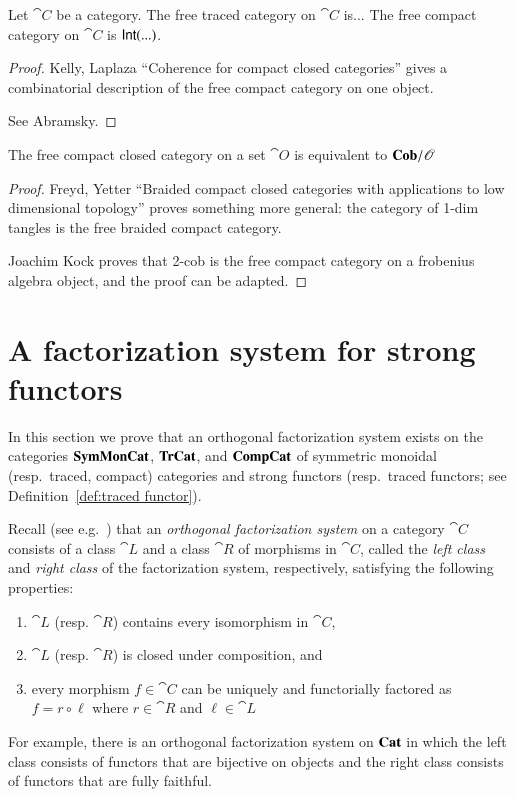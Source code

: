 \documentclass[12pt,oneside,article,draft]{memoir}
\begin{document}
\begin{proposition}\label{prop:free traced and compact}
	Let $\cat{C}$ be a category.
	The free traced category on $\cat{C}$ is...
	The free compact category on $\cat{C}$ is $\mathsf{Int}(...)$.
\end{proposition}
\begin{proof}
	Kelly, Laplaza ``Coherence for compact closed categories'' gives a combinatorial description of the free compact category on one object. 

	See Abramsky. 
\end{proof}

\begin{proposition}\label{prop:free compact is Cob}
	The free compact closed category on a set $\cat{O}$ is equivalent to $\mathbf{Cob}/\mathscr{O}$
\end{proposition}
\begin{proof}
	Freyd, Yetter ``Braided compact closed categories with applications to low dimensional topology'' proves something more general: the category of 1-dim tangles is the free braided compact category. 

	Joachim Kock proves that 2-cob is the free compact category on a frobenius algebra object, and the proof can be adapted.
\end{proof}

\section{A factorization system for strong functors}\label{sec:factorization system}

In this section we prove that an orthogonal factorization system exists on the categories $\mathbf{SymMonCat}$, $\mathbf{TrCat}$, and $\mathbf{CompCat}$ of symmetric monoidal (resp.\ traced, compact) categories and strong functors (resp.\ traced functors; see Definition~\ref{def:traced functor}). 

Recall (see e.g.~\cite{AdamekHerrlichStrecker}) that an \emph{orthogonal factorization system} on a category $\cat{C}$ consists of a class $\cat{L}$ and a class $\cat{R}$ of morphisms in $\cat{C}$, called the \emph{left class} and \emph{right class} of the factorization system, respectively, satisfying the following properties:
\begin{enumerate}
	\item $\cat{L}$ (resp. $\cat{R}$) contains every isomorphism in $\cat{C}$, 
	\item $\cat{L}$ (resp. $\cat{R}$) is closed under composition, and
	\item every morphism $f\in\cat{C}$ can be uniquely and functorially factored as $f=r\circ\ell$ where $r\in\cat{R}$ and $\ell\in\cat{L}$
\end{enumerate}
For example, there is an orthogonal factorization system on $\mathbf{Cat}$ in which the left class consists of functors that are bijective on objects and the right class consists of functors that are fully faithful. 
\end{document}
